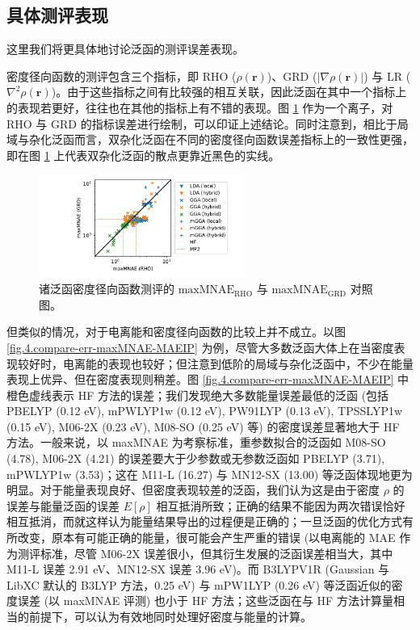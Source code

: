 \subsection{具体测评表现}

这里我们将更具体地讨论泛函的测评误差表现。

密度径向函数的测评包含三个指标，即 RHO ($\rho(\bm{r})$)、GRD ($|\nabla \rho(\bm{r})|$) 与 LR ($\nabla^2 \rho(\bm{r})$)。由于这些指标之间有比较强的相互关联，因此泛函在其中一个指标上的表现若更好，往往也在其他的指标上有不错的表现。图 \ref{fig.4.compare-err-RHO-GRD} 作为一个离子，对 RHO 与 GRD 的指标误差进行绘制，可以印证上述结论。同时注意到，相比于局域与杂化泛函而言，双杂化泛函在不同的密度径向函数误差指标上的一致性更强，即在图 \ref{fig.4.compare-err-RHO-GRD} 上代表双杂化泛函的散点更靠近黑色的实线。

\begin{figure}[t]
    \centering
    \includegraphics[width=0.6\textwidth]{assets/compare-err-RHO-GRD.pdf}
    \caption{诸泛函密度径向函数测评的 $\text{maxMNAE}_\text{RHO}$ 与 $\text{maxMNAE}_\text{GRD}$ 对照图。}
    \label{fig.4.compare-err-RHO-GRD}
\end{figure}

但类似的情况，对于电离能和密度径向函数的比较上并不成立。以图 \ref{fig.4.compare-err-maxMNAE-MAEIP} 为例，尽管大多数泛函大体上在当密度表现较好时，电离能的表现也较好；但注意到低阶的局域与杂化泛函中，不少在能量表现上优异、但在密度表现则稍差。图 \ref{fig.4.compare-err-maxMNAE-MAEIP} 中橙色虚线表示 HF 方法的误差；我们发现绝大多数能量误差最低的泛函 (包括 PBELYP (0.12 eV), mPWLYP1w (0.12 eV), PW91LYP (0.13 eV), TPSSLYP1w (0.15 eV), M06-2X (0.23 eV), M08-SO (0.25 eV) 等) 的密度误差显著地大于 HF 方法。一般来说，以 maxMNAE 为考察标准，重参数拟合的泛函如 M08-SO (4.78), M06-2X (4.21) 的误差要大于少参数或无参数泛函如 PBELYP (3.71), mPWLYP1w (3.53)；这在 M11-L (16.27) 与 MN12-SX (13.00) 等泛函体现地更为明显。对于能量表现良好、但密度表现较差的泛函，我们认为这是由于密度 $\rho$ 的误差与能量泛函的误差 $E[\rho]$ 相互抵消所致；正确的结果不能因为两次错误恰好相互抵消，而就这样认为能量结果导出的过程便是正确的\cite{Hammes-Schiffer-Hammes-Schiffer.S.2017, Korth-Korth.ACIE.2017, Graziano-Graziano.NRC.2017}；一旦泛函的优化方式有所改变，原本有可能正确的能量，很可能会产生严重的错误 (以电离能的 MAE 作为测评标准，尽管 M06-2X 误差很小，但其衍生发展的泛函误差相当大，其中 M11-L 误差 2.91 eV、MN12-SX 误差 3.96 eV)。而 B3LYPV1R (Gaussian 与 LibXC 默认的 B3LYP 方法，0.25 eV) 与 mPW1LYP (0.26 eV) 等泛函近似的密度误差 (以 maxMNAE 评测) 也小于 HF 方法；这些泛函在与 HF 方法计算量相当的前提下，可以认为有效地同时处理好密度与能量的计算。

